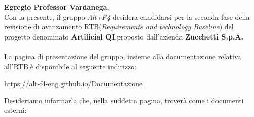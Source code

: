 \documentclass[a4paper, 12pt]{article}
\begin{document}
\primapagina

\newpage

\noindent
\textbf{Egregio Professor Vardanega}, \\
Con la presente, il gruppo \textit{Alt+F4} desidera candidarsi per la seconda fase della revisione di avanzamento RTB(\textit{Requirements and technology Baseline}) del progetto denominato \textbf{Artificial QI},proposto dall'azienda  \textbf{Zucchetti S.p.A.}\\
\\
La pagina di presentazione del gruppo, insieme alla documentazione relativa all'RTB,è disponibile al seguente indirizzo: 
\begin{center}
    \href{https://alt-f4-eng.github.io/Documentazione}{https://alt-f4-eng.github.io/Documentazione}\\
\end{center}
Desideriamo informarla che, nella suddetta pagina, troverà come i documenti esterni:
\end{document}
